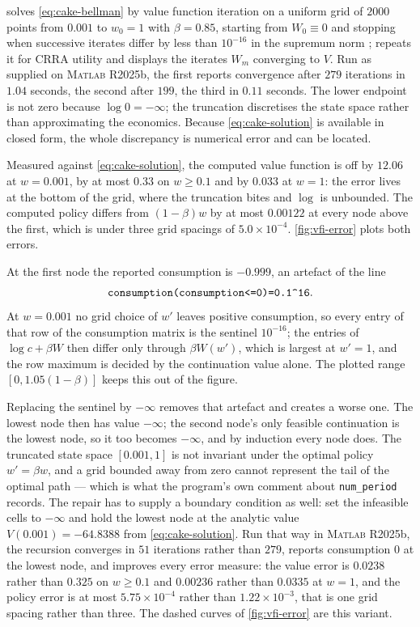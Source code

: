 \begin{remark}\label{rem:cake-numerics}
	 solves \eqref{eq:cake-bellman} by value function
	iteration on a uniform grid of $2000$ points from $0.001$ to $w_0=1$ with
	$\beta=0.85$, starting from $W_0\equiv0$ and stopping when successive iterates
	differ by less than $10^{-16}$ in the supremum norm
	\autocite[slides 23--30]{fukuda2026dynamic};
	 repeats it for CRRA utility and
	 displays the iterates $W_m$ converging
	to $V$. Run as supplied on \textsc{Matlab} R2025b, the first reports
	convergence after $279$ iterations in $1.04$ seconds, the second after $199$,
	the third in $0.11$ seconds. The lower endpoint is not zero because
	$\log0=-\infty$; the truncation discretises the state space rather than
	approximating the economics. Because \eqref{eq:cake-solution} is available in
	closed form, the whole discrepancy is numerical error and can be located.

	Measured against \eqref{eq:cake-solution}, the computed value function is off
	by $12.06$ at $w=0.001$, by at most $0.33$ on $w\geq0.1$ and by $0.033$ at
	$w=1$: the error lives at the bottom of the grid, where the truncation bites
	and $\log$ is unbounded. The computed policy differs from $(1-\beta)w$ by at
	most $0.00122$ at every node above the first, which is under three grid
	spacings of $5.0\times10^{-4}$. \autoref{fig:vfi-error} plots both errors.

	At the first node the reported consumption is $-0.999$, an artefact of the line
	\[
		\verb|consumption(consumption<=0)=0.1^16|.
	\]
	At $w=0.001$ no grid choice of $w'$
	leaves positive consumption, so every entry of that row of the consumption
	matrix is the sentinel $10^{-16}$; the entries of $\log c+\beta W$ then differ
	only through $\beta W(w')$, which is largest at $w'=1$, and the row maximum is
	decided by the continuation value alone. The plotted range
	$[0,1.05(1-\beta)]$ keeps this out of the figure.

	Replacing the sentinel by $-\infty$ removes that artefact and creates a worse
	one. The lowest node then has value $-\infty$; the second node's only feasible
	continuation is the lowest node, so it too becomes $-\infty$, and by induction
	every node does. The truncated state space $[0.001,1]$ is not invariant under
	the optimal policy $w'=\beta w$, and a grid bounded away from zero cannot
	represent the tail of the optimal path --- which is what the program's own
	comment about \verb|num_period| records. The repair has to supply a boundary
	condition as well: set the infeasible cells to $-\infty$ and hold the lowest
	node at the analytic value $V(0.001)=-64.8388$ from \eqref{eq:cake-solution}.
	Run that way in \textsc{Matlab} R2025b, the recursion converges in $51$
	iterations rather than $279$, reports consumption $0$ at the lowest node, and
	improves every error measure: the value error is $0.0238$ rather than $0.325$
	on $w\geq0.1$ and $0.00236$ rather than $0.0335$ at $w=1$, and the policy
	error is at most $5.75\times10^{-4}$ rather than $1.22\times10^{-3}$, that is
	one grid spacing rather than three. The dashed curves of
	\autoref{fig:vfi-error} are this variant.


\end{remark}
